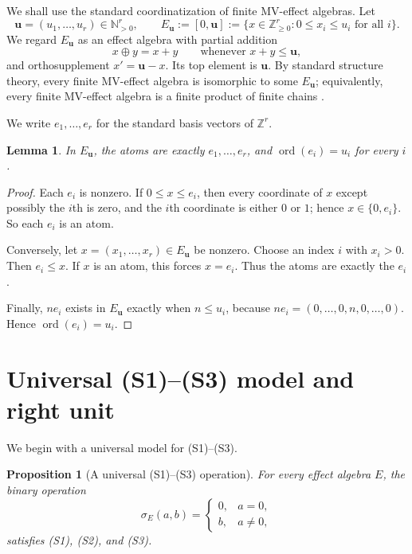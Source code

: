 \documentclass[11pt]{article}
\newtheorem{proposition}[theorem]{Proposition}
\newtheorem{lemma}[theorem]{Lemma}
\theoremstyle{definition}
\theoremstyle{remark}
\numberwithin{equation}{section}
\newcommand{\op}{\oplus}
\newcommand{\NN}{\mathbb{N}}
\newcommand{\ZZ}{\mathbb{Z}}
\newcommand{\ord}{\operatorname{ord}}
\begin{document}
We shall use the standard coordinatization of finite MV-effect algebras. Let
\[
\mathbf u=(u_1,\dots,u_r)\in\NN_{>0}^r,
\qquad
E_{\mathbf u}:=[0,\mathbf u]:=\{x\in\ZZ_{\ge 0}^r: 0\le x_i\le u_i\text{ for all }i\}.
\]
We regard $E_{\mathbf u}$ as an effect algebra with partial addition
\[
x\op y=x+y \qquad\text{whenever }x+y\le \mathbf u,
\]
and orthosupplement $x'=\mathbf u-x$. Its top element is $\mathbf u$. By standard structure theory, every finite MV-effect algebra is isomorphic to some $E_{\mathbf u}$; equivalently, every finite MV-effect algebra is a finite product of finite chains \cite[pp.~211--212]{JencovaPulmannova2008}.

We write $e_1,\dots,e_r$ for the standard basis vectors of $\ZZ^r$.

\begin{lemma}\label{lem:atoms-in-Eu}
In $E_{\mathbf u}$, the atoms are exactly $e_1,\dots,e_r$, and $\ord(e_i)=u_i$ for every $i$.
\end{lemma}

\begin{proof}
Each $e_i$ is nonzero. If $0\le x\le e_i$, then every coordinate of $x$ except possibly the $i$th is zero, and the $i$th coordinate is either $0$ or $1$; hence $x\in\{0,e_i\}$. So each $e_i$ is an atom.

Conversely, let $x=(x_1,\dots,x_r)\in E_{\mathbf u}$ be nonzero. Choose an index $i$ with $x_i>0$. Then $e_i\le x$. If $x$ is an atom, this forces $x=e_i$. Thus the atoms are exactly the $e_i$.

Finally, $ne_i$ exists in $E_{\mathbf u}$ exactly when $n\le u_i$, because $ne_i=(0,\dots,0,n,0,\dots,0)$. Hence $\ord(e_i)=u_i$.
\end{proof}

\section{Universal \textup{(S1)}--\textup{(S3)} model and right unit}\label{sec:general-structural}
We begin with a universal model for \textup{(S1)}--\textup{(S3)}.

\begin{proposition}[A universal \textup{(S1)}--\textup{(S3)} operation]\label{prop:sigma-general}
For every effect algebra $E$, the binary operation
\begin{equation}\label{eq:sigma-general}
\sigma_E(a,b)=
\begin{cases}
0,& a=0,\\
b,& a\neq 0,
\end{cases}
\end{equation}
satisfies \textup{(S1)}, \textup{(S2)}, and \textup{(S3)}.
\end{proposition}
\end{document}
